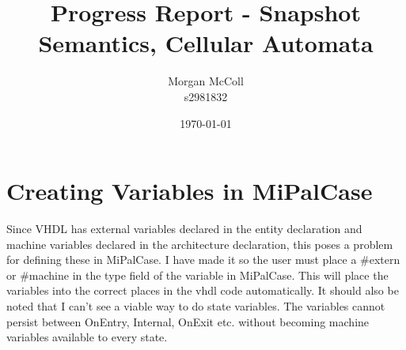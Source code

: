 \documentclass{article}
\begin{document}
	\title{Progress Report - Snapshot Semantics, Cellular Automata}
	\author{Morgan McColl \\s2981832}
	\date{\today}
	\maketitle
	\section{Creating Variables in MiPalCase}
		Since VHDL has external variables declared in the entity declaration and machine variables declared in the architecture declaration, this poses a problem for defining these in MiPalCase. I have made it so the user must place a \#extern or \#machine in the type field of the variable in MiPalCase. This will place the variables into the correct places in the vhdl code automatically. It should also be noted that I can't see a viable way to do state variables. The variables cannot persist between OnEntry, Internal, OnExit etc. without becoming machine variables available to every state.
\end{document}
